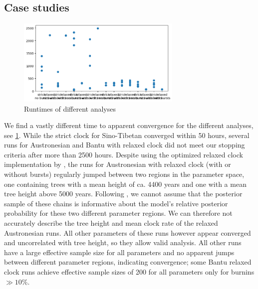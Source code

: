 \documentclass[]{rsos}%
\begin{document}
\subsection{Case studies}
\begin{figure}
  \centering
  \includegraphics[width=0.7\textwidth]{supplement/analysis/runtimes.png}
  \caption{Runtimes of different analyses}\label{f:runtimes}
\end{figure}
We find a vastly different time to apparent convergence for the different
analyses, see \cref{f:runtimes}. While the strict clock for Sino-Tibetan converged within 50 hours,
several runs for Austronesian and Bantu with relaxed clock did not meet our
stopping criteria after more than 2500 hours. Despite using the optimized relaxed clock
implementation by \textcite{orc}, the runs for Austronesian with relaxed clock
(with or without bursts) regularly jumped between two regions in the parameter
space, one containing trees with a mean height of ca. 4400 years and one with a
mean tree height above 5000 years. Following \textcite{brown2018behavior}, we cannot
assume that the posterior sample of these chains is informative about the
model's relative posterior probability for these two different parameter regions.
We can therefore not accurately describe the tree height and mean clock rate of
the relaxed Austronesian runs. All other parameters of these runs however appear
converged and uncorrelated with tree height, so they allow valid analysis.
All other runs have a large effective sample size for all parameters
and no apparent jumps between different parameter regions,
indicating convergence; some Bantu relaxed clock runs achieve
effective sample sizes of 200 for all parameters only for burnins $\gg 10\%$.
\end{document}
